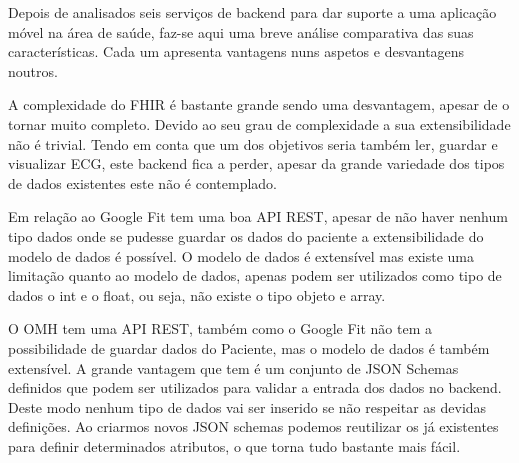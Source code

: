 Depois de analisados seis serviços de backend para dar suporte a uma aplicação móvel na área de saúde, faz-se aqui uma breve análise comparativa das suas características. Cada um apresenta vantagens nuns aspetos e desvantagens noutros.
\par 
A complexidade do \gls{FHIR} é bastante grande sendo uma desvantagem, apesar de o tornar muito completo. Devido ao seu grau de complexidade a sua extensibilidade não é trivial. Tendo em conta que um dos objetivos seria também ler, guardar e visualizar \gls{ECG}, este backend fica a perder, apesar da grande variedade dos tipos de dados existentes este não é contemplado.
\par 
Em relação ao Google Fit tem uma boa \gls{API} \gls{REST}, apesar de não haver nenhum tipo dados onde se pudesse guardar os dados do paciente a extensibilidade do modelo de dados é possível. O modelo de dados é extensível mas existe uma limitação quanto ao modelo de dados, apenas podem ser utilizados como tipo de dados o int e o float, ou seja, não existe o tipo objeto e array.
\par 
O \gls{OMH} tem uma \gls{API} \gls{REST}, também como o Google Fit não tem a possibilidade de guardar dados do Paciente, mas o modelo de dados é também extensível. A grande vantagem que tem é um conjunto de \gls{JSON} Schemas definidos que podem ser utilizados para validar a entrada dos dados no backend. Deste modo nenhum tipo de dados vai ser inserido se não respeitar as devidas definições. Ao criarmos novos \gls{JSON} schemas podemos reutilizar os já existentes para definir determinados atributos, o que torna tudo bastante mais fácil.






\cleardoublepage